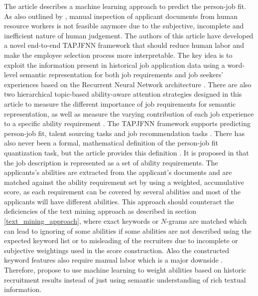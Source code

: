 \documentclass[draft,final]{thesisclass} %
\begin{document}
The article \textcite{pj_fit_ml} describes a machine learning approach to predict the person-job fit.
As also outlined by \textcite[1]{pj_fit_ml}, manual inspection of applicant documents from human resource workers is not feasible anymore due to the subjective, incomplete and inefficient nature of human judgement.
The authors of this article have developed a novel end-to-end \gls{TAPJFNN} framework that should reduce human labor and make the employee selection process more interpretable.
The key idea is to exploit the information present in historical job application data using a word-level semantic representation for both job requirements and job seekers' experiences based on the Recurrent Neural Network architecture \parencite[1]{pj_fit_ml}.
There are also two hierarchical topic-based ability-aware attention strategies designed in this article to measure the different importance of job requirements for semantic representation, as well as measure the varying contribution of each job experience to a specific ability requirement \parencite[1]{pj_fit_ml}.
The \acs{TAPJFNN} framework supports predicting person-job fit, talent sourcing tasks and job recommendation tasks \parencite[1]{pj_fit_ml}.
There has also never been a formal, mathematical definition of the person-job fit quantization task, but the article \textcite{pj_fit_ml} provides this definition \parencite[2]{pj_fit_ml}.
It is proposed in \textcite[2]{pj_fit_ml} that the job description is represented as a set of ability requirements.
The applicants's abilities are extracted from the applicant's documents and are matched against the ability requirement set by using a weighted, accumulative score, as each requirement can be covered by several abilities and most of the applicants will have different abilities. 
This approach should counteract the deficiencies of the text mining approach as described in section \ref{text_mining_approach}, where exact keywords or $N$-grams are matched which can lead to ignoring of some abilities if some abilities are not described using the expected keyword list or to misleading of the recruiters due to incomplete or subjective weightings used in the score construction.
Also the constructed keyword features also require manual labor which is a major downside \parencite[5]{pj_fit_ml}.
Therefore, \textcite[2]{pj_fit_ml} propose to use machine learning to weight abilities based on historic recruitment results instead of just using semantic understanding of rich textual information.
\end{document}
